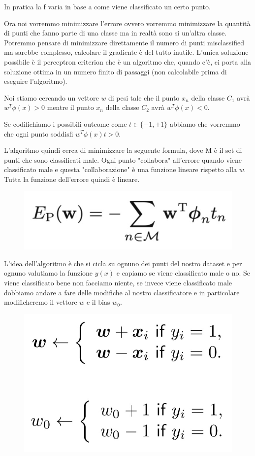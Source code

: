 \documentclass[14pt]{extreport}
\begin{document}
In pratica la f varia in base a come viene classificato un certo punto.

Ora noi vorremmo minimizzare l'errore ovvero vorremmo minimizzare la quantità di punti che fanno parte di una classe ma in realtà sono si un'altra
classe. Potremmo pensare di minimizzare direttamente il numero di punti misclassified ma sarebbe complesso, calcolare il gradiente è del tutto
inutile. L'unica soluzione possibile è il perceptron criterion che è un algoritmo che, quando c'è, ci porta alla soluzione ottima in un numero finito
di passaggi (non calcolabile prima di eseguire l'algoritmo).

Noi stiamo cercando un vettore $w$ di pesi tale che il punto $x_n$ della classe $C_1$ avrà $w^T\phi(x) > 0$ mentre il punto $x_n$ della classe $C_2$
avrà $w^T\phi(x)<0$.

Se codifichiamo i possibili outcome come $t \in \{-1, +1\}$ abbiamo che vorremmo che ogni punto soddisfi $w^T\phi(x)t > 0$.

L'algoritmo quindi cerca di minimizzare la seguente formula, dove M è il set di punti che sono classificati male. Ogni punto "collabora" all'errore
quando viene classificato male e questa "collaborazione" è una funzione lineare rispetto alla $w$. Tutta la funzione dell'errore quindi è lineare.

\begin{figure}[H]
\centering
\includegraphics[width=0.7\linewidth]{197.jpeg}
\end{figure}

L'idea dell'algoritmo è che si cicla su ognuno dei punti del nostro dataset e per ognuno valutiamo la funzione $y(x)$ e capiamo se viene classificato
male o no. Se viene classificato bene non facciamo niente, se invece viene classificato male dobbiamo andare a fare delle modifiche al nostro
classificatore e in particolare modificheremo il vettore $w$ e il bias $w_0$.


\begin{figure}[H]
\centering
\includegraphics[width=0.4\linewidth]{151.jpeg}
\end{figure}
\end{document}
